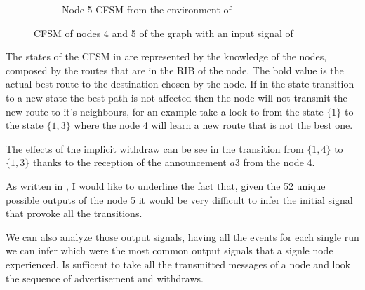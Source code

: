 \begin{figure}[h]
\begin{subfigure}[b]{0.45\textwidth}
		 \caption{Node \num{5} \ac{CFSM} from the environment of }
         \label{fig:fsm_node5}
     \end{subfigure}
		\caption{\ac{CFSM} of nodes \num{4} and \num{5} of the graph  with an input signal of }
        \label{fig:fsm_griffin_fig4}
\end{figure}

The states of the \ac{CFSM} in  are represented by the
knowledge of the nodes, composed by the routes that are in the \ac{RIB} of the node.
The bold value is the actual best route to the destination chosen by the node.
If in the state transition to a new state the best path is not affected then the
node will not transmit the new route to it's neighbours, for an example take
a look to  from the state $\{1\}$ to the state $\{1, 3\}$
where the node \num{4} will learn a new route that is not the best one.

The effects of the implicit withdraw can be see in 
the transition from $\{1, 4\}$ to $\{1, 3\}$ thanks to the reception of the
announcement $a3$ from the node \num{4}.

As written in \cite{griffinFSM}, I would like to underline the fact that, given
the \num{52} unique possible outputs of the node \num{5} it would be very difficult
to infer the initial signal that provoke all the transitions.

We can also analyze those output signals, having all the events for each single
run we can infer which were the most common output signals that a signle node
experienced.
Is sufficent to take all the transmitted messages of a node and look the sequence
of advertisement and withdraws.

